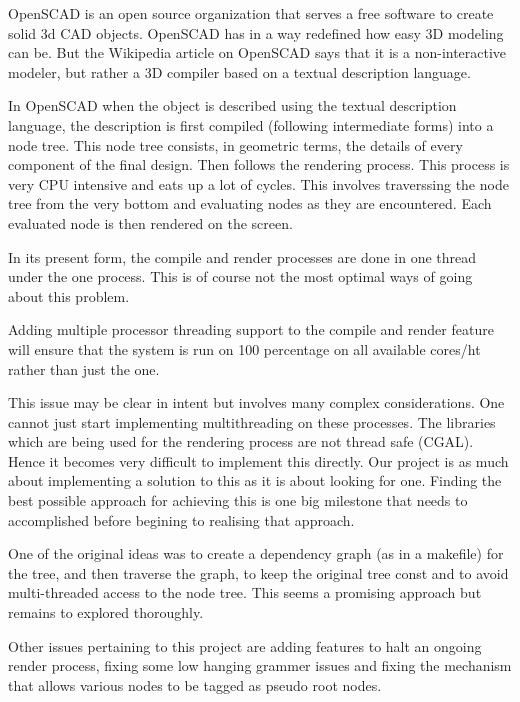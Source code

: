 \begin{Large}
\end{Large}
OpenSCAD is an open source organization that serves a free software to create solid 3d CAD objects. OpenSCAD has in a way redefined how easy 3D modeling can be. But the Wikipedia article on OpenSCAD says that it is a non-interactive modeler, but rather a 3D compiler based on a textual description language.

In OpenSCAD when the object is described using the textual description language, the description is first compiled (following intermediate forms) into a node tree. This node tree consists, in geometric terms, the details of every component of the final design. Then follows the rendering process. This process is very CPU intensive and eats up a lot of cycles. This involves traverssing the node tree from the very bottom and evaluating nodes as they are encountered. Each evaluated node is then rendered on the screen.

In its present form, the compile and render processes are done in one thread under the one process. This is of course not the most optimal ways of going about this problem.

Adding multiple processor threading support to the compile and render feature will ensure that the system is run on 100 percentage on all available cores/ht rather than just the one.

This issue may be clear in intent but involves many complex considerations. One cannot just start implementing multithreading on these processes. The libraries which are being used for the rendering process are not thread safe (CGAL). Hence it becomes very difficult to implement this directly. Our project is as much about implementing a solution to this as it is about looking for one. Finding the best possible approach for achieving this is one big milestone that needs to accomplished before begining to realising that approach.

One of the original ideas was to create a dependency graph (as in a makefile) for the tree, and then traverse the graph, to keep the original tree const and to avoid multi-threaded access to the node tree. This seems a promising approach but remains to explored thoroughly.

Other issues pertaining to this project are adding features to halt an ongoing render process, fixing some low hanging grammer issues and fixing the mechanism that allows various nodes to be tagged as pseudo root nodes.
